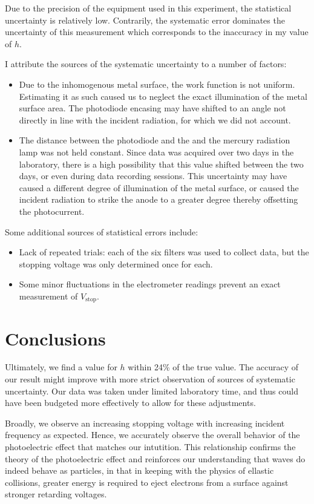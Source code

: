 \documentclass[aps,twocolumn,secnumarabic,balancelastpage,amsmath,amssymb,nofootinbib, floatfix]{revtex4-2}
\begin{document}
Due to the precision of the equipment used in this experiment, the statistical uncertainty is relatively low. Contrarily, the systematic error dominates the uncertainty of this measurement which corresponds to the inaccuracy in my value of $h$. 

I attribute the sources of the systematic uncertainty to a number of factors:
\begin{itemize}
	\item Due to the inhomogenous metal surface, the work function is not uniform. Estimating it as such caused us to neglect the exact illumination of the metal surface area. The photodiode encasing may have shifted to an angle not directly in line with the incident radiation, for which we did not account. 
	\item The distance between the photodiode and the and the mercury radiation lamp was not held constant. Since data was acquired over two days in the laboratory, there is a high possibility that this value shifted between the two days, or even during data recording sessions. This uncertainty may have caused a different degree of illumination of the metal surface, or caused the incident radiation to strike the anode to a greater degree thereby offsetting the photocurrent. 
\end{itemize}  
Some additional sources of statistical errors include:
\begin{itemize}
	\item Lack of repeated trials: each of the six filters was used to collect data, but the stopping voltage was only determined once for each.
	\item Some minor fluctuations in the electrometer readings prevent an exact measurement of $V_{\mathrm{stop}}$. 
\end{itemize}
\section{Conclusions}
Ultimately, we find a value for $h$ within 24\% of the true value. The accuracy of our result might improve with more strict observation of sources of systematic uncertainty. Our data was taken under limited laboratory time, and thus could have been budgeted more effectively to allow for these adjustments. 

Broadly, we observe an increasing stopping voltage with increasing incident frequency as expected. Hence, we accurately observe the overall behavior of the photoelectric effect that matches our intutition. This relationship confirms the theory of the photoelectric effect and reinforces our understanding that waves do indeed behave as particles, in that in keeping with the physics of ellastic collisions, greater energy is required to eject electrons from a surface against stronger retarding voltages. 
\end{document}
